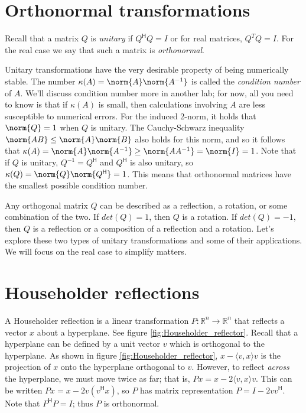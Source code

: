 \label{lab:Canonical_Transformations}

\section*{Orthonormal transformations}
Recall that a matrix $Q$ is \emph{unitary} if $Q^\mathsf{H} Q = I$ or for real matrices,
$Q^T Q = I$.
For the real case we say that such a matrix is \emph{orthonormal}.

Unitary transformations have the very desirable property of being numerically stable.
The number $\kappa(A) = \norm{A} \norm{A^{-1}}$ is called the \emph{condition number} of $A$.
We'll discuss condition number more in another lab; for now, all you need to know is that if $\kappa(A)$ is small, then calculations involving $A$ are less susceptible to numerical errors.
For the induced 2-norm, it holds that $\norm{Q}=1$ when $Q$ is unitary.
The Cauchy-Schwarz inequality $\norm{AB} \leq \norm{A} \norm{B}$ also holds for this norm, and
so it follows that $\kappa(A) = \norm{A} \norm{A^{-1}} \geq \norm{A A^{-1}} = \norm{I} = 1$.
Note that if $Q$ is unitary, $Q^{-1} = Q^\mathsf{H}$ and $Q^\mathsf{H}$ is also unitary, so $\kappa(Q) = \norm{Q} \norm{Q^\mathsf{H}} = 1$.
This means that orthonormal matrices have the smallest possible condition number.

Any orthogonal matrix $Q$ can be described as a reflection, a rotation, or some combination of the two.
If $det(Q) = 1$, then $Q$ is a rotation.
If $det(Q) = -1$, then $Q$  is a reflection or a composition of a reflection and a rotation.
Let's explore these two types of unitary transformations and some of their applications.
We will focus on the real case to simplify matters.

\section*{Householder reflections}
A Householder reflection is a linear transformation $P: \mathbb{R}^n \rightarrow \mathbb{R}^n$ that reflects a vector $x$ about a hyperplane.
See figure \ref{fig:Householder_reflector}.
Recall that a hyperplane can be defined by a unit vector $v$ which is orthogonal to the hyperplane.
As shown in figure \ref{fig:Householder_reflector}, $x - \langle v,x \rangle v$ is the projection of $x$ onto the hyperplane orthogonal to $v$.
However, to reflect \emph{across} the hyperplane, we must move twice as far; that is, $Px = x - 2\langle v,x \rangle v$.
This can be written $Px = x - 2v(v^\mathsf{H} x)$, so $P$ has matrix representation $P = I - 2v v^\mathsf{H}$.
Note that $P^\mathsf{H} P = I$; thus $P$ is orthonormal.

